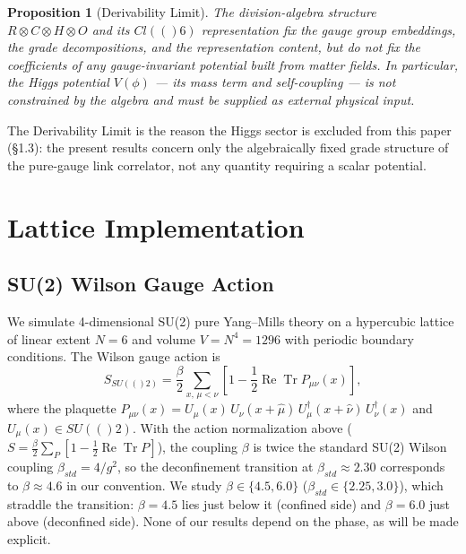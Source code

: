 \documentclass[12pt,a4paper]{article}
\newtheorem{proposition}[theorem]{Proposition}
\newcommand{\Cl}{\mathrm{Cl}}
\newcommand{\SU}{\mathrm{SU}}
\renewcommand{\Re}{\operatorname{Re}}
\newcommand{\Tr}{\operatorname{Tr}}
\newcommand{\HH}{\mathbb{H}}
\newcommand{\RR}{\mathbb{R}}
\newcommand{\CC}{\mathbb{C}}
\newcommand{\OO}{\mathbb{O}}
\def\Cl#1{Cl(#1)}%
\def\SU#1{SU(#1)}%
\def\HH{H}%
\def\RR{R}%
\def\CC{C}%
\def\OO{O}%
\def\mathbb#1{#1}%
\def\mathrm#1{#1}%
\begin{document}
	\begin{proposition}[Derivability Limit]
		The division-algebra structure $\RR\otimes\CC\otimes\HH\otimes\OO$ and its
		$\Cl(6)$ representation fix the gauge group embeddings, the grade decompositions,
		and the representation content, but do not fix the coefficients of any
		gauge-invariant potential built from matter fields. In particular, the Higgs
		potential $V(\phi)$ --- its mass term and self-coupling --- is not constrained by
		the algebra and must be supplied as external physical input.
	\end{proposition}
	
	\noindent
	The Derivability Limit is the reason the Higgs sector is excluded from this paper
	(\S1.3): the present results concern only the algebraically fixed grade structure of
	the pure-gauge link correlator, not any quantity requiring a scalar potential.
	
	\section{Lattice Implementation}
	\label{sec:lattice}
	
	\subsection{SU(2) Wilson Gauge Action}
	
	We simulate 4-dimensional SU(2) pure Yang--Mills theory on a hypercubic lattice
	of linear extent $N=6$ and volume $V=N^4=1296$ with periodic boundary conditions.
	The Wilson gauge action is
	\begin{equation}
		S_{\SU(2)} = \frac{\beta}{2}\sum_{x,\,\mu<\nu}
		\left[1-\frac{1}{2}\Re\Tr P_{\mu\nu}(x)\right],
	\end{equation}
	where the plaquette
	$P_{\mu\nu}(x)=U_\mu(x)\,U_\nu(x+\hat\mu)\,U_\mu^\dagger(x+\hat\nu)\,U_\nu^\dagger(x)$
	and $U_\mu(x)\in\SU(2)$.  With the action normalization above
	($S=\tfrac{\beta}{2}\sum_P[1-\tfrac12\Re\Tr P]$), the coupling $\beta$ is twice the
	standard SU(2) Wilson coupling $\beta_{\mathrm{std}}=4/g^2$, so the deconfinement
	transition at $\beta_{\mathrm{std}}\approx2.30$ corresponds to $\beta\approx4.6$ in
	our convention.  We study $\beta\in\{4.5,6.0\}$ ($\beta_{\mathrm{std}}\in\{2.25,3.0\}$),
	which straddle the transition: $\beta=4.5$ lies just below it (confined side) and
	$\beta=6.0$ just above (deconfined side).  None of our results depend on the phase,
	as will be made explicit.
	
\end{document}
